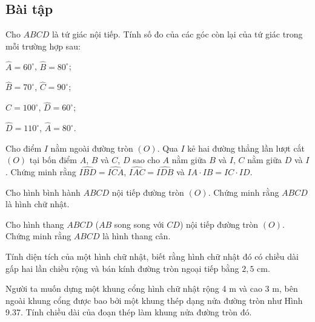 \begin{exercises}
    \subsection{Bài tập}

    \begin{questions}[resume=SGK]
        \item Cho $ABCD$ là tứ giác nội tiếp. Tính số đo của các góc còn lại của tứ giác trong mỗi trường hợp sau:
        \begin{questions}
            \item $\widehat A=60^\circ$, $\widehat B=80^\circ$;
            \item $\widehat B=70^\circ$, $\widehat C=90^\circ$;
            \item $\widehat C=100^\circ$, $\widehat D=60^\circ$;
            \item $\widehat D=110^\circ$, $\widehat A=80^\circ$.
        \end{questions}

        \answerline
        \answerline

        \item Cho điểm $I$ nằm ngoài đường tròn $(O)$. Qua $I$ kẻ hai đường thẳng lần lượt cắt $(O)$ tại bốn điểm $A$, $B$ và $C$, $D$ sao cho $A$ nằm giữa $B$ và $I$, $C$ nằm giữa $D$ và $I$. Chứng minh rằng $\widehat{IBD}=\widehat{ICA}$, $\widehat{IAC}=\widehat{IDB}$ và $IA\cdot IB=IC\cdot ID$.

        \answerline
        \answerline
        \answerline

        \item Cho hình bình hành $ABCD$ nội tiếp đường tròn $(O)$. Chứng minh rằng $ABCD$ là hình chữ nhật.

        \answerline
        \answerline

        \item Cho hình thang $ABCD$ ($AB$ song song với $CD$) nội tiếp đường tròn $(O)$. Chứng minh rằng $ABCD$ là hình thang cân.

        \answerline
        \answerline

        \item Tính diện tích của một hình chữ nhật, biết rằng hình chữ nhật đó có chiều dài gấp hai lần chiều rộng và bán kính đường tròn ngoại tiếp bằng $2{,}5$ cm.

        \answerline
        \answerline
        \answerline

        \item Người ta muốn dựng một khung cổng hình chữ nhật rộng 4 m và cao 3 m, bên ngoài khung cổng được bao bởi một khung thép dạng nửa đường tròn như Hình 9.37. Tính chiều dài của đoạn thép làm khung nửa đường tròn đó.


\end{questions}
\end{exercises}
